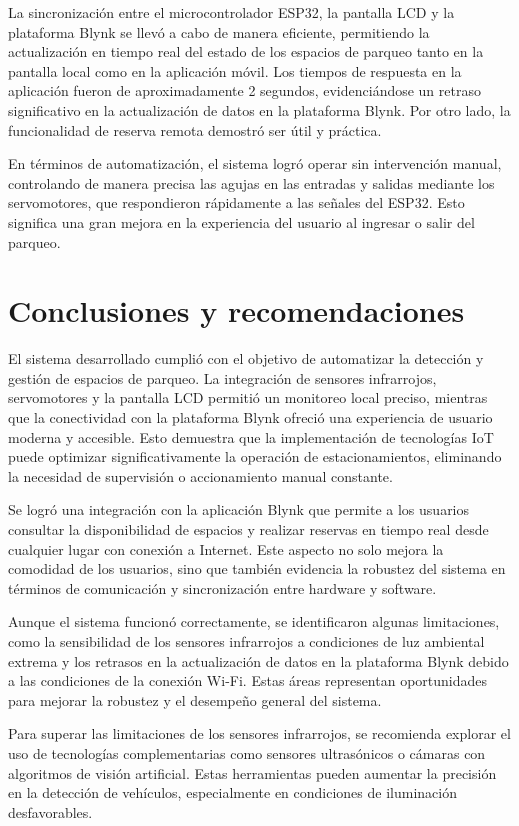 \documentclass[12pt,a4paper]{article}
\begin{document}
La sincronización entre el microcontrolador ESP32, la pantalla LCD y la plataforma Blynk se llevó a cabo de manera eficiente, permitiendo la actualización en tiempo real del estado de los espacios de parqueo tanto en la pantalla local como en la aplicación móvil. Los tiempos de respuesta en la aplicación fueron de aproximadamente 2 segundos, evidenciándose un retraso significativo en la actualización de datos en la plataforma Blynk. Por otro lado, la funcionalidad de reserva remota demostró ser útil y práctica.

En términos de automatización, el sistema logró operar sin intervención manual, controlando de manera precisa las agujas en las entradas y salidas mediante los servomotores, que respondieron rápidamente a las señales del ESP32. Esto significa una gran mejora en la experiencia del usuario al ingresar o salir del parqueo.

\section{Conclusiones y recomendaciones}

El sistema desarrollado cumplió con el objetivo de automatizar la detección y gestión de espacios de parqueo. La integración de sensores infrarrojos, servomotores y la pantalla LCD permitió un monitoreo local preciso, mientras que la conectividad con la plataforma Blynk ofreció una experiencia de usuario moderna y accesible. Esto demuestra que la implementación de tecnologías IoT puede optimizar significativamente la operación de estacionamientos, eliminando la necesidad de supervisión o accionamiento manual constante.

Se logró una integración con la aplicación Blynk que permite a los usuarios consultar la disponibilidad de espacios y realizar reservas en tiempo real desde cualquier lugar con conexión a Internet. Este aspecto no solo mejora la comodidad de los usuarios, sino que también evidencia la robustez del sistema en términos de comunicación y sincronización entre hardware y software.

Aunque el sistema funcionó correctamente, se identificaron algunas limitaciones, como la sensibilidad de los sensores infrarrojos a condiciones de luz ambiental extrema y los retrasos en la actualización de datos en la plataforma Blynk debido a las condiciones de la conexión Wi-Fi. Estas áreas representan oportunidades para mejorar la robustez y el desempeño general del sistema.

Para superar las limitaciones de los sensores infrarrojos, se recomienda explorar el uso de tecnologías complementarias como sensores ultrasónicos o cámaras con algoritmos de visión artificial. Estas herramientas pueden aumentar la precisión en la detección de vehículos, especialmente en condiciones de iluminación desfavorables.
\end{document}

